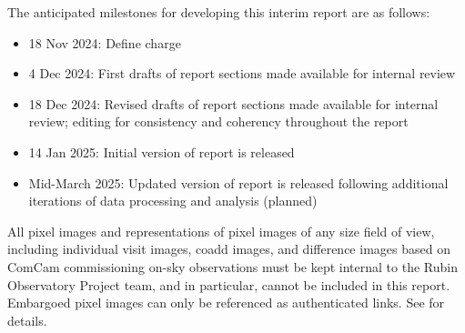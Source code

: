 The anticipated milestones for developing this interim report are as follows:

\begin{itemize}

    \item 18 Nov 2024: Define charge

    \item 4 Dec 2024: First drafts of report sections made available for internal review

    \item 18 Dec 2024: Revised drafts of report sections made available for internal review; editing for consistency and coherency throughout the report

    \item 14 Jan 2025: Initial version of report is released

    \item Mid-March 2025: Updated version of report is released following additional iterations of data processing and analysis (planned)

\end{itemize}

\begin{warning}
    All pixel images and representations of pixel images of any size field of view, including individual visit images, coadd images, and difference images based on ComCam commissioning on-sky observations must be kept internal to the Rubin Observatory Project team, and in particular, cannot be included in this report.
    Embargoed pixel images can only be referenced as authenticated links.
    See  for details.
\end{warning}